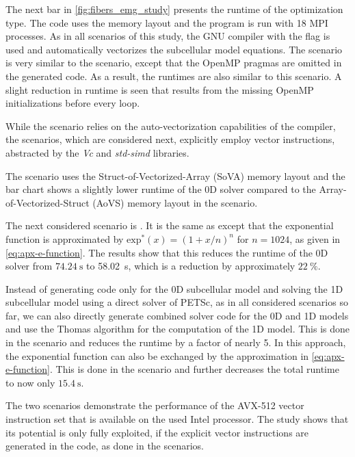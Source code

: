 The next bar in \cref{fig:fibers_emg_study} presents the runtime of the  optimization type. The code uses the  memory layout and the program is run with 18 MPI processes. As in all scenarios of this study, the GNU compiler with the  flag is used and automatically vectorizes the subcellular model equations. The  scenario is very similar to the  scenario, except that the OpenMP pragmas are omitted in the generated code. As a result, the runtimes are also similar to this scenario. A slight reduction in runtime is seen that results from the missing OpenMP initializations before every loop.

While the  scenario relies on the auto-vectorization capabilities of the compiler, the  scenarios, which are considered next, explicitly employ vector instructions, abstracted by the \emph{Vc} and \emph{std-simd} libraries. 

The  scenario uses the Struct-of-Vectorized-Array (SoVA) memory layout and the bar chart shows a slightly lower runtime of the 0D solver compared to the Array-of-Vectorized-Struct (AoVS) memory layout in the  scenario.

The next considered scenario is . It is the same as  except that the exponential function is approximated by $\textrm{exp}^\ast(x)=(1+x/n)^n$ for $n=1024$, as given in \cref{eq:apx-e-function}. The results show that this reduces the runtime of the 0D solver from $\SI{74.24}{\s}$ to \SI{58.02}{\s}, which is a reduction by approximately $\SI{22}{\percent}$.

Instead of generating code only for the 0D subcellular model and solving the 1D subcellular model using a direct solver of PETSc, as in all considered scenarios so far, we can also directly generate combined solver code for the 0D and 1D models and use the Thomas algorithm for the computation of the 1D model. This is done in the  scenario and reduces the runtime by a factor of nearly 5. In this approach, the exponential function can also be exchanged by the approximation in \cref{eq:apx-e-function}. This is done in the  scenario and further decreases the total runtime to now only $\SI{15.4}{\s}$.

The two  scenarios demonstrate the performance of the AVX-512 vector instruction set that is available on the used Intel processor. The study shows that its potential is only fully exploited, if the explicit vector instructions are generated in the code, as done in the  scenarios.

